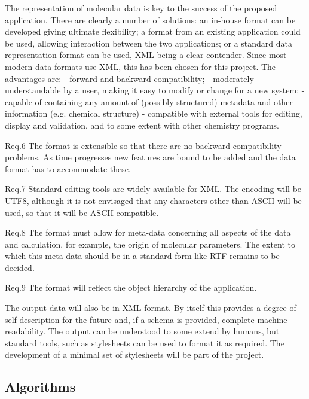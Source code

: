 The representation of molecular data is key to the success of the proposed application. There are clearly a number of solutions: an in-house format can be developed giving ultimate flexibility; a format from an existing application could be used, allowing interaction between the two applications; or a standard data representation format can be used, XML being a clear contender. Since most modern data formats use XML, this has been chosen for this project. The advantages are: 
-	forward and backward compatibility;
-	moderately understandable by a user, making it easy to modify or change for a new system;
-	capable of containing any amount of (possibly structured) metadata and other information (e.g. chemical structure)
-	compatible with external tools for editing, display and validation, and to some extent with other chemistry programs.

Req.6 The format is extensible so that there are no backward compatibility problems. As time progresses new features are bound to be added and the data format has to accommodate these.

Req.7 
Standard editing tools are widely available for XML. The encoding will be UTF8, although it is not envisaged that any characters other than ASCII will be used, so that it will be ASCII compatible.

Req.8 The format must allow for meta-data concerning all aspects of the data and calculation, for example, the origin of molecular parameters. The extent to which this meta-data should be in a standard form like RTF remains to be decided.

Req.9 The format will reflect the object hierarchy of the application.

The output data will also be in XML format. By itself this provides a degree of self-description for the future and, if a schema is provided, complete machine readability. The output can be understood to some extend by humans, but standard tools, such as stylesheets can be used to format it as required. The development of a minimal set of stylesheets will be part of the project. 

\subsection{Algorithms}\label{sec:Algorithms}


